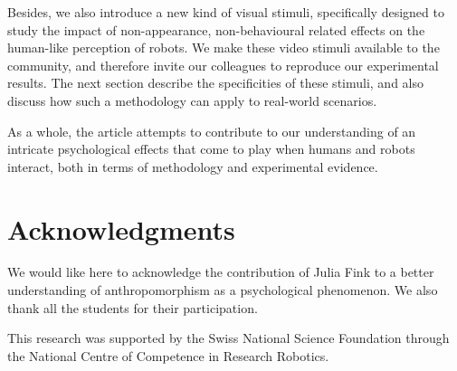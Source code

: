 \documentclass[lettersize, noapacite, twoside, HRI]{apa_HRI}
\begin{document}
Besides, we also introduce a new kind of visual stimuli, specifically designed
to study the impact of non-appearance, non-behavioural related effects on the
human-like perception of robots. We make these video stimuli available to the
community, and therefore invite our colleagues to reproduce our experimental
results. The next section describe the specificities of these stimuli, and also
discuss how such a methodology can apply to real-world scenarios.

As a whole, the article attempts to contribute to our understanding of an
intricate psychological effects that come to play when humans and robots
interact, both in terms of methodology and experimental evidence.


\section*{Acknowledgments}

We would like here to acknowledge the contribution of Julia Fink to a better
understanding of anthropomorphism as a psychological phenomenon. We also thank
all the students for their participation.

This research was supported by the Swiss National Science Foundation through the
National Centre of Competence in Research Robotics.





%
%
\end{document}
